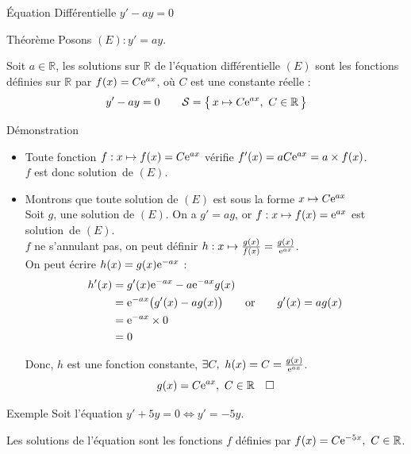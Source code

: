 \documentclass{coursbook}
\begin{document}
    \begin{Gpartie}{Équation Différentielle $y'-ay=0$} 
        \begin{Spartie}{Théorème} 
            Posons $(E) : y'=ay$.

            Soit $a\in\mathbb{R}$, les solutions sur $\mathbb{R}$ de l'équation différentielle $(E)$ sont les fonctions définies sur $\mathbb{R}$ par $f(x)=C\mathrm{e}^{ax}$, où $C$ est une constante réelle :
            \[y'-ay=0\qquad\mathcal{S}=\big\{\,x\mapsto C\mathrm{e}^{ax},~C\in\mathbb{R}\,\big\}\]

            \begin{SSpartie}{Démonstration} 
                \begin{itemize}
                    \item Toute fonction $f:x\mapsto f(x)=C\mathrm{e}^{ax}$ vérifie $f'(x)=aC\mathrm{e}^{ax}=a\times f(x)$. \\ $f$ est donc solution~de $(E)$.
                    \item Montrons que toute solution de $(E)$ est sous la forme $x\mapsto C\mathrm{e}^{ax}$ \\
                    Soit $g$, une solution de $(E)$. On a $g'=ag$, or $f:x\mapsto f(x)=\mathrm{e}^{ax}$ est solution~de $(E)$. \\
                    $f$ ne s'annulant pas, on peut définir $h:x\mapsto \frac{g(x)}{f(x)}=\frac{g(x)}{\me^{ax}}$. \\
                    On peut écrire $h(x)=g(x)\mathrm{e}^{-ax}$ :
                    \[\begin{aligned}[t]
                        h'(x)&=g'(x)\mathrm{e}^{-ax}-a\mathrm{e}^{-ax}g(x) \\
                        &=\mathrm{e}^{-ax}\big(g'(x)-ag(x)\big)\qquad\text{or}\qquad g'(x)=ag(x) \\
                        &=\mathrm{e}^{-ax}\times 0 \\
                        &=0
                    \end{aligned}\]

                    Donc, $h$ est une fonction constante, $\exists C,~h(x)=C=\frac{g(x)}{\me^{ax}}$.
                    \[g(x)=C\mathrm{e}^{ax},~C\in\mathbb{R}\quad\square\]
                \end{itemize}
            \end{SSpartie}
            \begin{Spartie}{Exemple} 
                Soit l'équation $y'+5y=0\iff y'=-5y$.

                Les solutions de l'équation sont les fonctions $f$ définies par $f(x)=C\me^{-5x},\ C\in\mathbb{R}$.
            \end{Spartie}
        \end{Spartie}
    \end{Gpartie}
\end{document}
